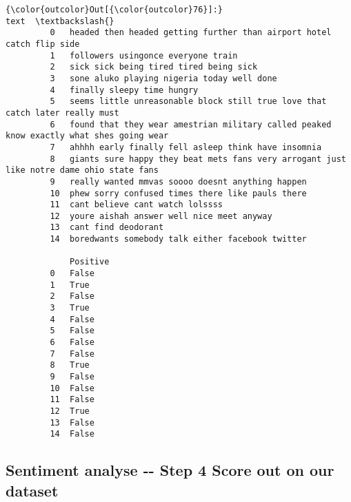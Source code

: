 \documentclass[11pt]{article}
\begin{document}
\begin{Verbatim}[commandchars=\\\{\}]
{\color{outcolor}Out[{\color{outcolor}76}]:}                                                                                         text  \textbackslash{}
         0   headed then headed getting further than airport hotel catch flip side                      
         1   followers usingonce everyone train                                                         
         2   sick sick being tired tired being sick                                                     
         3   sone aluko playing nigeria today well done                                                 
         4   finally sleepy time hungry                                                                 
         5   seems little unreasonable block still true love that catch later really must               
         6   found that they wear amestrian military called peaked know exactly what shes going wear    
         7   ahhhh early finally fell asleep think have insomnia                                        
         8   giants sure happy they beat mets fans very arrogant just like notre dame ohio state fans   
         9   really wanted mmvas soooo doesnt anything happen                                           
         10  phew sorry confused times there like pauls there                                           
         11  cant believe cant watch lolssss                                                            
         12  youre aishah answer well nice meet anyway                                                  
         13  cant find deodorant                                                                        
         14  boredwants somebody talk either facebook twitter                                           
         
             Positive  
         0   False     
         1   True      
         2   False     
         3   True      
         4   False     
         5   False     
         6   False     
         7   False     
         8   True      
         9   False     
         10  False     
         11  False     
         12  True      
         13  False     
         14  False     
\end{Verbatim}
            
    \subsection{Sentiment analyse -\/- Step 4 Score out on our
dataset}\label{sentiment-analyse----step-4-score-out-on-our-dataset}
\end{document}
